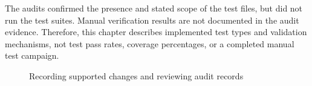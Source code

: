 The audits confirmed the presence and stated scope of the test files, but did not run the test suites. Manual verification results are not documented in the audit evidence. Therefore, this chapter describes implemented test types and validation mechanisms, not test pass rates, coverage percentages, or a completed manual test campaign.

\begin{figure}[H]
    \centering
    \caption{Recording supported changes and reviewing audit records}
    \label{fig:ch3-seq-audit}
\end{figure}

